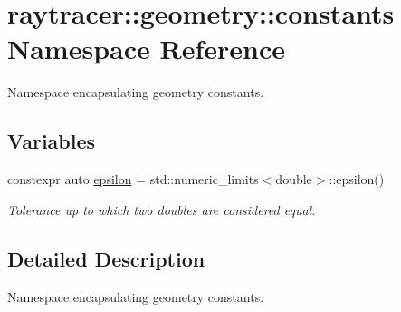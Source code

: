 \hypertarget{namespaceraytracer_1_1geometry_1_1constants}{}\section{raytracer\+:\+:geometry\+:\+:constants Namespace Reference}
\label{namespaceraytracer_1_1geometry_1_1constants}


Namespace encapsulating geometry constants.  


\subsection*{Variables}
\begin{DoxyCompactItemize}
\item 
\mbox{\label{namespaceraytracer_1_1geometry_1_1constants_a80ccdf72b510d9d25567fb9c8cc883d7}} 
constexpr auto \hyperlink{namespaceraytracer_1_1geometry_1_1constants_a80ccdf72b510d9d25567fb9c8cc883d7}{epsilon} = std\+::numeric\+\_\+limits$<$double$>$\+::epsilon()
\begin{DoxyCompactList}\small\item\em Tolerance up to which two doubles are considered equal. \end{DoxyCompactList}\end{DoxyCompactItemize}


\subsection{Detailed Description}
Namespace encapsulating geometry constants. 